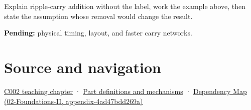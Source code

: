 Explain ripple-carry addition without the label, work the example above, then state the assumption whose removal would change the result.

\textbf{Pending:} physical timing, layout, and faster carry networks.

\section{Source and navigation}\label{appendix-17917d9fdbe3-source-and-navigation}

\href{Continuous\%20Notes/Computing\%20Foundations\%20-\%20From\%20Bits\%20to\%20C++\%20and\%20Systems\%20APIs\#Arithmetic\%20becomes\%20a\%20policy}{C002 teaching chapter} · \hyperref[appendix-fd090d982a15]{Part definitions and mechanisms} · \href{../02-Foundations-II/main.pdf\#nameddest=appendix-4ad47bdd269a}{Dependency Map (02-Foundations-II, appendix-4ad47bdd269a)}

